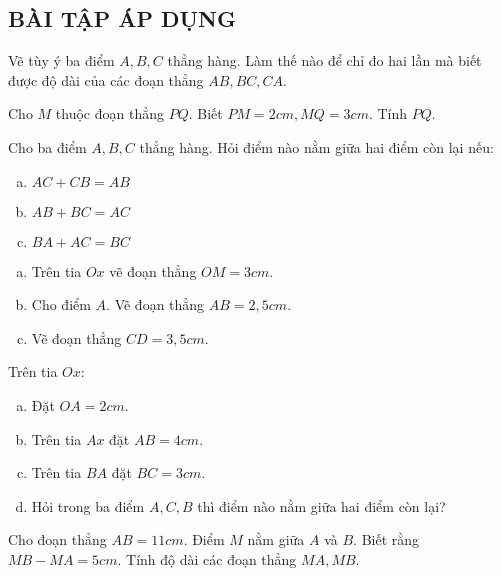 \subsection{BÀI TẬP ÁP DỤNG}
\begin{bt} Vẽ tùy ý ba điểm $A, B, C$ thẳng hàng. Làm thế nào để chỉ đo hai lần mà biết được độ dài của các đoạn thẳng $AB, BC, CA$.
\end{bt}   \begin{bt}
Cho $M$ thuộc đoạn thẳng $PQ$. Biết $PM = 2cm, MQ = 3 cm$. Tính $PQ$.
\end{bt}   \begin{bt}
Cho ba điểm $A, B, C$ thẳng hàng. Hỏi điểm nào nằm giữa hai điểm còn lại nếu:
\begin{enumerate}[a)]
\item $AC + CB = AB$
\item $AB + BC = AC$
\item $BA + AC = BC$
\end{enumerate}
\end{bt}   \begin{bt} \qquad
\begin{enumerate}[a)]
\item	Trên tia $Ox$ vẽ đoạn thẳng $OM = 3cm$.
\item	Cho điểm $A$. Vẽ đoạn thẳng $AB = 2,5cm$.
\item	Vẽ đoạn thẳng $CD = 3,5 cm$.
\end{enumerate}
\end{bt}   \begin{bt}
Trên tia $Ox$:
\begin{enumerate}[a)]
\item	Đặt $OA = 2 cm$.
\item	Trên tia $Ax$ đặt $AB = 4cm$.
\item	Trên tia $BA$ đặt $BC = 3 cm$.
\item	Hỏi trong ba điểm $A, C, B$ thì điểm nào nằm giữa hai điểm còn lại?
\end{enumerate}
\end{bt}   \begin{bt}
Cho đoạn thẳng $AB = 11cm$. Điểm $M$ nằm giữa $A$ và $B$. Biết rằng $MB - MA = 5cm$. Tính độ dài các đoạn thẳng $MA, MB$.

\end{bt}
